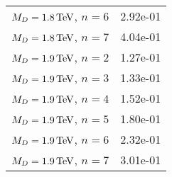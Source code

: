 \begin{table}[hbtp]
\begin{center}
{\begin{tabular}{lr}
$M_{D} = 1.8 \,\text{Te\hspace{-.08em}V}$, $n=6$  & 2.92e-01 \\
$M_{D} = 1.8 \,\text{Te\hspace{-.08em}V}$, $n=7$  & 4.04e-01 \\
$M_{D} = 1.9 \,\text{Te\hspace{-.08em}V}$, $n=2$  & 1.27e-01 \\
$M_{D} = 1.9 \,\text{Te\hspace{-.08em}V}$, $n=3$  & 1.33e-01 \\
$M_{D} = 1.9 \,\text{Te\hspace{-.08em}V}$, $n=4$  & 1.52e-01 \\
$M_{D} = 1.9 \,\text{Te\hspace{-.08em}V}$, $n=5$  & 1.80e-01 \\
$M_{D} = 1.9 \,\text{Te\hspace{-.08em}V}$, $n=6$  & 2.32e-01 \\
$M_{D} = 1.9 \,\text{Te\hspace{-.08em}V}$, $n=7$  & 3.01e-01 \\\hline
  \end{tabular}
}
  \end{center}
\end{table}



